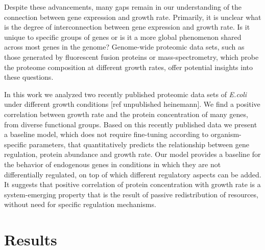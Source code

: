 \documentclass[notitlepage]{article}
\begin{document}
Despite these advancements, many gaps remain in our understanding of the connection between gene expression and growth rate.
Primarily, it is unclear what is the degree of interconnection between gene expression and growth rate.
Is it unique to specific groups of genes or is it a more global phenomenon shared across most genes in the genome?
Genome-wide proteomic data sets, such as those generated by fluorescent fusion proteins or mass-spectrometry, which probe the proteome composition at different growth rates, offer potential insights into these questions.

In this work we analyzed two recently published proteomic data sets of \emph{E.coli} under different growth conditions \parencite{Valgepea2013} [ref unpublished heinemann].
We find a positive correlation between growth rate and the protein concentration of many genes, from diverse functional groups.
Based on this recently published data we present a baseline model, which does not require fine-tuning according to organism-specific parameters, that quantitatively predicts the relationship between gene regulation, protein abundance and growth rate.
Our model provides a baseline for the behavior of endogenous genes in conditions in which they are not differentially regulated, on top of which different regulatory aspects can be added.
It suggests that positive correlation of protein concentration with growth rate is a system-emerging property that is the result of passive redistribution of resources, without need for specific regulation mechanisms.

\section{Results}
\end{document}
